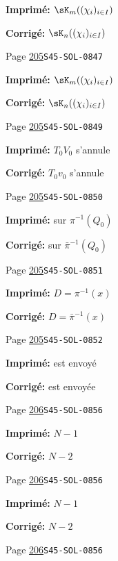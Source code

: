 \documentclass[oneside]{book}
\theoremstyle{sga-source}
\theoremstyle{sga-source-dash}
\theoremstyle{sga-source-dotdash}
\theoremstyle{sga-source-number-note-dash}
\theoremstyle{sga-source-note-number-dotdash}
\theoremstyle{sga-source-example-dotdash}
\theoremstyle{sga-source-inline-number}
\theoremstyle{sga-source-bare-number}
\theoremstyle{sga-source}
\begin{document}
\begin{description}
\par\noindent\textbf{Imprimé:} \(\sK_m((\chi_i)_{i\in I})\)
\par\noindent\textbf{Corrigé:} \(\sK_n((\chi_i)_{i\in I})\)
\smallskip
\item[\hypertarget{apparatus:FR-0196}{196}] Page \hyperlink{printpage:fr:205}{205}\quad\texttt{S45-SOL-0847}
\par\noindent\textbf{Imprimé:} \(\sK_m((\chi_i)_{i\in I})\)
\par\noindent\textbf{Corrigé:} \(\sK_n((\chi_i)_{i\in I})\)
\smallskip
\item[\hypertarget{apparatus:FR-0197}{197}] Page \hyperlink{printpage:fr:205}{205}\quad\texttt{S45-SOL-0849}
\par\noindent\textbf{Imprimé:} $T_0 V_0$ s'annule
\par\noindent\textbf{Corrigé:} $T_0 v_0$ s'annule
\smallskip
\item[\hypertarget{apparatus:FR-0198}{198}] Page \hyperlink{printpage:fr:205}{205}\quad\texttt{S45-SOL-0850}
\par\noindent\textbf{Imprimé:} sur $\pi^{-1}(Q_0)$
\par\noindent\textbf{Corrigé:} sur $\bar\pi^{-1}(Q_0)$
\smallskip
\item[\hypertarget{apparatus:FR-0199}{199}] Page \hyperlink{printpage:fr:205}{205}\quad\texttt{S45-SOL-0851}
\par\noindent\textbf{Imprimé:} $D=\pi^{-1}(x)$
\par\noindent\textbf{Corrigé:} $D=\bar\pi^{-1}(x)$
\smallskip
\item[\hypertarget{apparatus:FR-0200}{200}] Page \hyperlink{printpage:fr:205}{205}\quad\texttt{S45-SOL-0852}
\par\noindent\textbf{Imprimé:} est envoyé
\par\noindent\textbf{Corrigé:} est envoyée
\smallskip
\item[\hypertarget{apparatus:FR-0201}{201}] Page \hyperlink{printpage:fr:206}{206}\quad\texttt{S45-SOL-0856}
\par\noindent\textbf{Imprimé:} \(N-1\)
\par\noindent\textbf{Corrigé:} \(N-2\)
\smallskip
\item[\hypertarget{apparatus:FR-0202}{202}] Page \hyperlink{printpage:fr:206}{206}\quad\texttt{S45-SOL-0856}
\par\noindent\textbf{Imprimé:} \(N-1\)
\par\noindent\textbf{Corrigé:} \(N-2\)
\smallskip
\item[\hypertarget{apparatus:FR-0203}{203}] Page \hyperlink{printpage:fr:206}{206}\quad\texttt{S45-SOL-0856}

\end{description}
\end{document}
